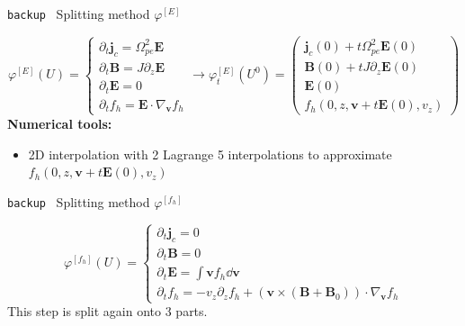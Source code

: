 \documentclass{beamer}
\newcommand{\mbold}[1]{{\textbf{\color{PLB}#1}}}
\newcommand{\Mvb}[1]{\boldsymbol{#1}}
\newenvironment{bframe}[1]%
{%
  \begin{frame}{{\small\texttt{backup}\ } #1}
}%
{%
  \end{frame}
}
\begin{document}
\begin{bframe}{Splitting method $\varphi^{[E]}$}
  $$
    \varphi^{[E]}(U) =
    \begin{cases}
      \partial_t \Mvb{j}_c = \Omega_{pe}^2\Mvb{E} \\
      \partial_t \Mvb{B} = J\partial_z\Mvb{E} \\
      \partial_t \Mvb{E} = 0 \\
      \partial_t f_h = \Mvb{E}\cdot\nabla_{\Mvb{v}}f_h
    \end{cases}
    \rightarrow
    \varphi_{t}^{[E]}(U^0) = \begin{pmatrix}
      \Mvb{j}_c(0) + t\Omega_{pe}^2\Mvb{E}(0) \\
      \Mvb{B}(0) + tJ\partial_z\Mvb{E}(0) \\
      \Mvb{E}(0) \\
      f_h(0,z,\Mvb{v}+t\Mvb{E}(0),v_z)
    \end{pmatrix}
  $$
  \mbold{Numerical tools:}
  \begin{itemize}
    \item 2D interpolation with 2 Lagrange 5 interpolations to approximate $f_h(0,z,\Mvb{v}+t\Mvb{E}(0),v_z)$
  \end{itemize}
\end{bframe}
\begin{bframe}{Splitting method $\varphi^{[f_h]}$}
  $$
    \varphi^{[f_h]}(U) =
    \begin{cases}
      \partial_t \Mvb{j}_c = 0 \\
      \partial_t \Mvb{B} = 0 \\
      \partial_t \Mvb{E} = \int\Mvb{v}f_h\dd{\Mvb{v}} \\
      \partial_t f_h = -v_z\partial_zf_h + (\Mvb{v}\times(\Mvb{B}+\Mvb{B}_0))\cdot\nabla_{\Mvb{v}}f_h
    \end{cases}
  $$
  This step is split again onto 3 parts.
\end{bframe}
\end{document}

